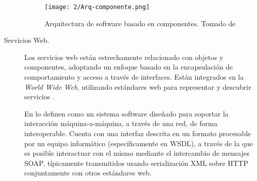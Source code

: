 \begin{description}
	\begin{figure}%
		\texttt{[image: 2/Arq-componente.png]}
		\caption{Arquitectura de software basado en componentes. Tomado de \CO}
		\label{fig:Arq-componente}
	\end{figure}
	
	\item [Servicios Web.]    
	Los \gls{servicios web} están estrechamente relacionado con objetos y componentes,  adoptando un enfoque basado en la encapsulación de comportamiento y acceso a través de interfaces. Están integrados en la \textit{World Wide Web}, utilizando estándares web para representar y descubrir servicios . 
	
	En  lo definen como un sistema software diseñado para soportar la interacción máquina-a-máquina, a través de una red, de forma interoperable. Cuenta con una interfaz descrita en un formato procesable por un equipo informático (específicamente en WSDL), a través de la que es posible interactuar con el mismo mediante el intercambio de mensajes SOAP, típicamente transmitidos usando serialización XML sobre HTTP conjuntamente con otros estándares web.
	

	
	
\end{description}

